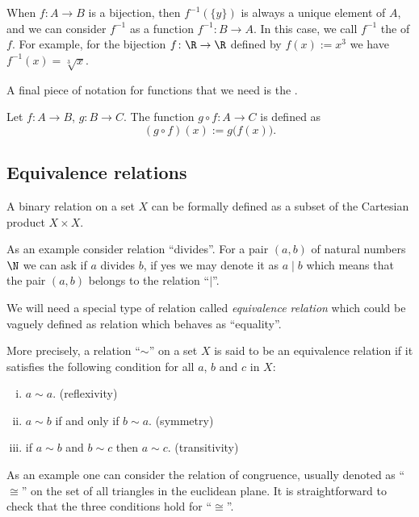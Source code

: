\documentclass[12pt]{book}
\begin{document}
When $f \colon A \to B$ is a bijection, then $f^{-1}(\{y\})$ is always
a unique element of $A$, and we can consider $f^{-1}$ as a function
$f^{-1} \colon B \to A$.
In this case, we call $f^{-1}$ the \emph{} of $f$.
For example, for the bijection $f \colon \R \to \R$ defined by $f(x) := x^3$ we have
$f^{-1}(x) = \sqrt[3]{x}$.

A final piece of notation for functions that
we need is the \emph{}.

\begin{defn}
Let $f \colon A \to B$, $g \colon B \to C$.
The function 
$g \circ f \colon A \to C$ is defined as
\begin{equation*}
(g \circ f)(x) := g\bigl(f(x)\bigr) .
\end{equation*}
\end{defn}

\subsection*{Equivalence relations}

A binary relation on a set $X$ can be formally defined as a subset of the Cartesian product $X\times X$.

As an example consider relation ``divides''. 
For a pair $(a,b)$ of natural numbers $\N$ we can ask if $a$ divides $b$, if yes we may denote it as $a\mid b$ which means that the pair $(a,b)$ belongs to the relation ``$\mid$''.

We will need a special type of relation called \emph{equivalence relation} which could be vaguely defined as relation which behaves as ``equality''.

More precisely, a relation ``$\sim$'' on a set $X$ is said to be an equivalence relation if it satisfies the following condition for all $a$, $b$ and $c$ in $X$:
\begin{enumerate}[(i)]
\item $a\sim a$. (reflexivity)
\item $a\sim b$ if and only if $b\sim a$. (symmetry)
\item if $a\sim b$ and $b\sim c$ then $a\sim c$. (transitivity)
\end{enumerate}

As an example one can consider the relation of congruence, usually denoted as ``$\cong$'' on the set of all triangles in the euclidean plane.
It is straightforward to check that the three conditions hold for  ``$\cong$''.
\end{document}
